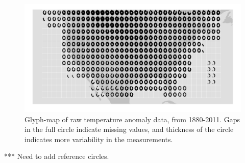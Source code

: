 \documentclass[oneside]{article}
\begin{document}
\begin{figure}[htbp]
  \centering

  \includegraphics[width=1\linewidth]{gistemp-polar-raw}

  \caption{Glyph-map of raw temperature anomaly data, from 1880-2011. Gaps in the full circle indicate missing values, and thickness of the circle indicates more variability in the measurements.}
  \label{fig:gistemp-raw}
\end{figure}

*** Need to add reference circles.
 




\end{document}

